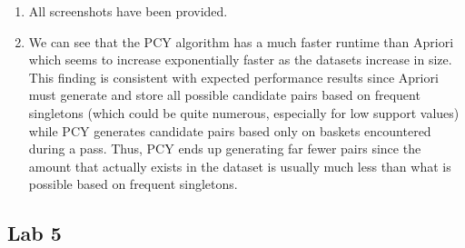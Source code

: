\documentclass{article}
\begin{document}
\begin{enumerate}[label=\alph*., left=10pt, itemsep=10pt]
        \item \begin{minipage}[t]{0.9\textwidth}
            All screenshots have been provided.
        \end{minipage}
        
        \item \begin{minipage}[t]{0.9\textwidth}
            We can see that the PCY algorithm has a much faster runtime than Apriori which seems to increase exponentially
            faster as the datasets increase in size. This finding is consistent with expected performance results since 
            Apriori must generate and store all possible candidate pairs based on frequent singletons (which could be quite
            numerous, especially for low support values) while PCY generates candidate pairs based only on baskets
            encountered during a pass. Thus, PCY ends up generating far fewer pairs since the amount that actually
            exists in the dataset is usually much less than what is possible based on frequent singletons. 
        \end{minipage}

    \end{enumerate}

    \subsection*{Lab 5} 
\end{document}
